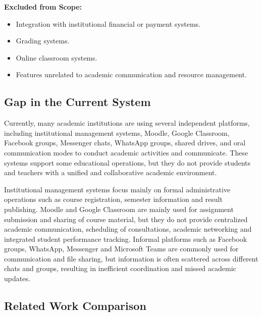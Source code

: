 \documentclass[12pt,a4paper]{article}
\begin{document}
\textbf{Excluded from Scope:}

\begin{itemize}[leftmargin=*, label=\textbullet]
  \item Integration with institutional financial or payment systems.
  \item Grading systems.
  \item Online classroom systems.
  \item Features unrelated to academic communication and resource management.
\end{itemize}

\subsection{Gap in the Current System}

Currently, many academic institutions are using several independent platforms, including institutional management systems, Moodle, Google Classroom, Facebook groups, Messenger chats, WhatsApp groups, shared drives, and oral communication modes to conduct academic activities and communicate. These systems support some educational operations, but they do not provide students and teachers with a unified and collaborative academic environment.

Institutional management systems focus mainly on formal administrative operations such as course registration, semester information and result publishing. Moodle and Google Classroom are mainly used for assignment submission and sharing of course material, but they do not provide centralized academic communication, scheduling of consultations, academic networking and integrated student performance tracking. Informal platforms such as Facebook groups, WhatsApp, Messenger and Microsoft Teams are commonly used for communication and file sharing, but information is often scattered across different chats and groups, resulting in inefficient coordination and missed academic updates.

\subsection{Related Work Comparison}
\end{document}
